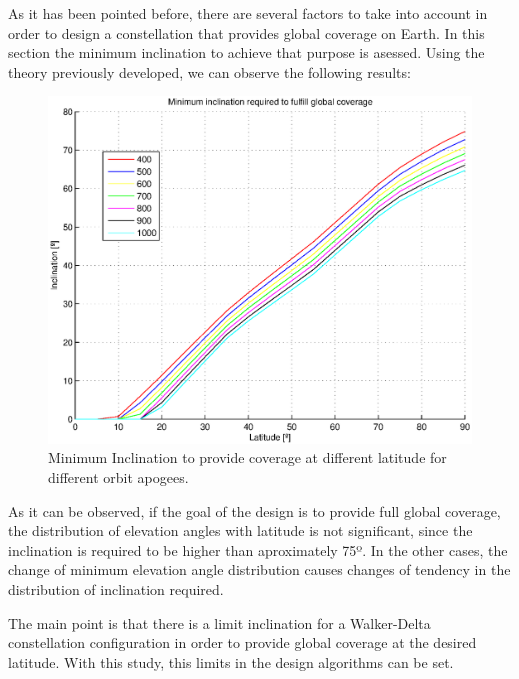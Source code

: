 As it has been pointed before, there are several factors to take into account in order to design a constellation that provides global coverage on Earth. In this section the minimum inclination to achieve that purpose is asessed. Using the theory previously developed, we can observe the following results:

\begin{figure}[H]
	\includegraphics[scale=0.8]{MinimumInclinationPlot}
	\caption{Minimum Inclination to provide coverage at different latitude for different orbit apogees.}	
\end{figure}

As it can be observed, if the goal of the design is to provide full global coverage, the distribution of elevation angles with latitude is not significant, since the inclination is required to be higher than aproximately 75º. In the other cases, the change of minimum elevation angle distribution causes changes of tendency in the distribution of inclination required. 

The main point is that there is a limit inclination for a Walker-Delta constellation configuration in order to provide global coverage at the desired latitude. With this study, this limits in the design algorithms can be set.